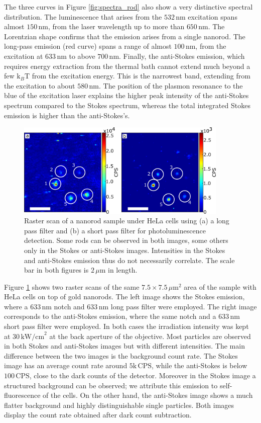 \documentclass[journal=nalefd,manuscript=letter]{achemso}
\newcommand{\nm}{\ensuremath{\,\textrm{nm}}}
\newcommand{\um}{\ensuremath{\,\mu\textrm{m}}}
\newcommand{\pwr}{\ensuremath{\,\textrm{kW/cm}^2}}
\newcommand{\CPS}{\ensuremath{\,\textrm{CPS}}}
\begin{document}
The three curves in Figure \ref{fig:spectra_rod} also show a very distinctive
spectral distribution. The luminescence that arises from the $532\nm$ excitation
spans almost $150\nm$, from the laser wavelength up to more than $650\nm$. The
Lorentzian shape confirms that the emission arises from a single nanorod. The
long-pass emission (red curve) spans a range of almost $100\nm$, from the
excitation at $633\nm$ to above $700\nm$. Finally, the anti-Stokes emission,
which requires energy extraction from the thermal bath cannot extend much beyond
a few $\textrm{k}_{B}\textrm{T}$ from the excitation energy. This is the
narrowest band, extending from the excitation to about $580\nm$. The position of
the plasmon resonance to the blue of the excitation laser explains the higher
peak intensity of the anti-Stokes spectrum compared to the Stokes spectrum,
whereas the total integrated Stokes emission is higher than the anti-Stokes's.

\begin{figure}[htp] \centering
\includegraphics[width=0.9\textwidth]{Figures/04_Stokes_AS/stokes_as_no_dye.png}
\caption{Raster scan of a nanorod sample under HeLa cells using (a) a long pass
filter and (b) a short pass filter for photoluminescence detection.
Some rods can be observed in both images, some others only in the Stokes or
anti-Stokes images. Intensities in the Stokes and anti-Stokes emission thus do
not necessarily correlate. The scale bar in both figures is $2\um$ in length.}
	\label{fig:stokes_as_no_dye}
\end{figure}

Figure \ref{fig:stokes_as_no_dye} shows two raster scans of the same
$7.5\times7.5\um^2$ area of the sample with HeLa cells on top of gold nanorods.
The left image shows the Stokes emission, where a $633\nm$ notch and $633\nm$
long pass filter were employed. The right image corresponds to the anti-Stokes
emission, where the same notch and a $633\nm$ short pass filter were employed.
In both cases the irradiation intensity was kept at $30\pwr$ at the back
aperture of the objective. Most particles are observed in both Stokes and anti-Stokes images
but with different intensities. The main difference between the two images is
the background count rate. The Stokes image has an average count rate around
$5\textrm{k}\CPS$, while the anti-Stokes is below $100\CPS$, close to the dark
counts of the detector. Moreover in the Stokes image a structured background can
be observed; we attribute this emission to self-fluorescence of the cells. On
the other hand, the anti-Stokes image shows a much flatter background and highly
distinguishable single particles. Both images display the count rate
obtained after dark count subtraction.
\end{document}
